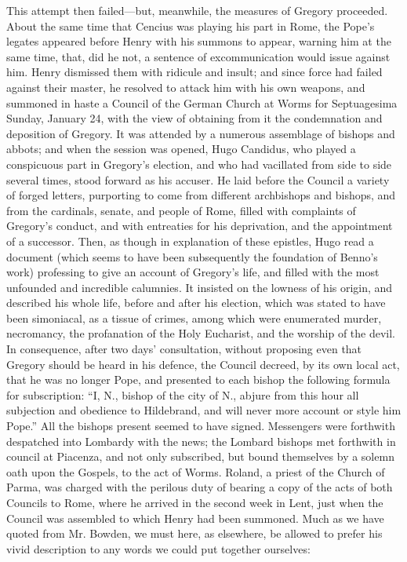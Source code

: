 This attempt then failed—but, meanwhile, the
measures of Gregory proceeded. About the same time that Cencius was
playing his part in Rome, the Pope's legates appeared before Henry
with his summons to appear, warning him at the same time, that, did he
not, a sentence of excommunication would issue against him. Henry
dismissed them with ridicule and insult; and since force had failed
against their master, he resolved to attack him with his own weapons,
and summoned in haste a Council of the German Church at Worms for
Septuagesima Sunday, January 24, with the view of obtaining from it
the condemnation and deposition of Gregory. It was attended by a
numerous assemblage of bishops and abbots; and when the session was
opened, Hugo Candidus, who played a conspicuous part in Gregory's
election, and who had vacillated from side to side several times,
stood forward as his accuser. He laid before the Council a variety of
forged letters, purporting to come from different archbishops
and bishops, and from the cardinals, senate, and people of Rome,
filled with complaints of Gregory's conduct, and with entreaties for
his deprivation, and the appointment of a successor. Then, as though
in explanation of these epistles, Hugo read a document (which seems to
have been subsequently the foundation of Benno's work) professing to
give an account of Gregory's life, and filled with the most unfounded
and incredible calumnies. It insisted on the lowness of his origin,
and described his whole life, before and after his election, which was
stated to have been simoniacal, as a tissue of crimes, among which
were enumerated murder, necromancy, the profanation of the Holy
Eucharist, and the worship of the devil. In consequence, after two
days' consultation, without proposing even that Gregory should be
heard in his defence, the Council decreed, by its own local act, that
he was no longer Pope, and presented to each bishop the following
formula for subscription: ``I, N., bishop of the city of N., abjure
from this hour all subjection and obedience to Hildebrand, and will
never more account or style him Pope.'' All the bishops present seemed
to have signed. Messengers were forthwith despatched into Lombardy
with the news; the Lombard bishops met forthwith in council at
Piacenza, and not only subscribed, but bound themselves by a solemn
oath upon the Gospels, to the act of Worms. Roland, a priest of the
Church of Parma, was charged with the perilous duty of bearing a copy
of the acts of both Councils to Rome, where he arrived in the second
week in Lent, just when the Council was assembled to which Henry had
been summoned. Much as we have quoted from Mr. Bowden, we must here,
as elsewhere, be allowed to prefer his vivid description to any words
we could put together ourselves:

